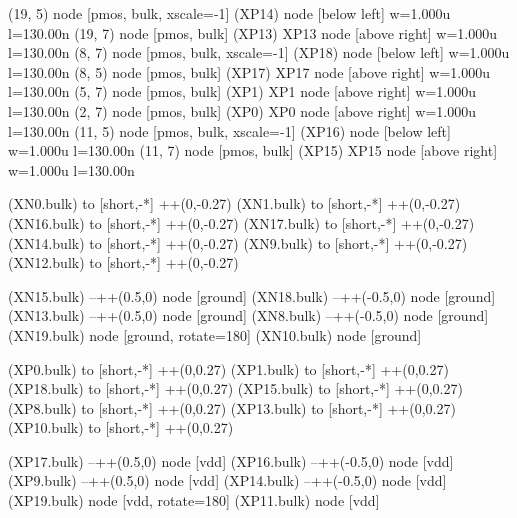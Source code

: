 \begin{circuitikz}[american]
	(19, 5) node [pmos, bulk, xscale=-1] (XP14) {} node [below left] {\tiny {w=1.000u l=130.00n}}
	(19, 7) node [pmos, bulk] (XP13) {XP13} node [above right] {\tiny {w=1.000u l=130.00n}}
	(8, 7) node [pmos, bulk, xscale=-1] (XP18) {} node [below left] {\tiny {w=1.000u l=130.00n}}
	(8, 5) node [pmos, bulk] (XP17) {XP17} node [above right] {\tiny {w=1.000u l=130.00n}}
	(5, 7) node [pmos, bulk] (XP1) {XP1} node [above right] {\tiny {w=1.000u l=130.00n}}
	(2, 7) node [pmos, bulk] (XP0) {XP0} node [above right] {\tiny {w=1.000u l=130.00n}}
	(11, 5) node [pmos, bulk, xscale=-1] (XP16) {} node [below left] {\tiny {w=1.000u l=130.00n}}
	(11, 7) node [pmos, bulk] (XP15) {XP15} node [above right] {\tiny {w=1.000u l=130.00n}}

	(XN0.bulk) to [short,-*] ++(0,-0.27)
	(XN1.bulk) to [short,-*] ++(0,-0.27)
	(XN16.bulk) to [short,-*] ++(0,-0.27)
	(XN17.bulk) to [short,-*] ++(0,-0.27)
	(XN14.bulk) to [short,-*] ++(0,-0.27)
	(XN9.bulk) to [short,-*] ++(0,-0.27)
	(XN12.bulk) to [short,-*] ++(0,-0.27)
	
	(XN15.bulk) --++(0.5,0) node [ground]{}
	(XN18.bulk) --++(-0.5,0) node [ground]{}
	(XN13.bulk) --++(0.5,0) node [ground]{}
	(XN8.bulk) --++(-0.5,0) node [ground]{}
	(XN19.bulk) node [ground, rotate=180]{}
	(XN10.bulk) node [ground]{}

		
	(XP0.bulk) to [short,-*] ++(0,0.27)
	(XP1.bulk) to [short,-*] ++(0,0.27)
	(XP18.bulk) to [short,-*] ++(0,0.27)
	(XP15.bulk) to [short,-*] ++(0,0.27)
	(XP8.bulk) to [short,-*] ++(0,0.27)
	(XP13.bulk) to [short,-*] ++(0,0.27)
	(XP10.bulk) to [short,-*] ++(0,0.27)


	(XP17.bulk) --++(0.5,0) node [vdd]{}
	(XP16.bulk) --++(-0.5,0) node [vdd]{}
	(XP9.bulk) --++(0.5,0) node [vdd]{}
	(XP14.bulk) --++(-0.5,0) node [vdd]{}
	(XP19.bulk) node [vdd, rotate=180]{}
	(XP11.bulk) node [vdd]{}



\end{circuitikz}
